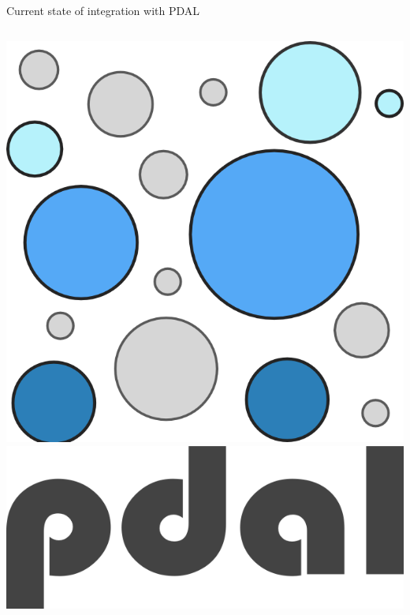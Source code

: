 \documentclass[xcolor={dvipsnames,usenames},beamer,aspectratio=43]{beamer}
\begin{document}
\begin{frame}{Current state of integration with PDAL}
\begin{columns}
\begin{column}{0.25\textwidth}
\begin{center}
  \includegraphics[width=\textwidth]{logos/pdal_bubbles}\\
  \includegraphics[width=\textwidth]{logos/pdal_text}
\end{center}

\end{column}
\end{columns}

\end{frame}
\end{document}
